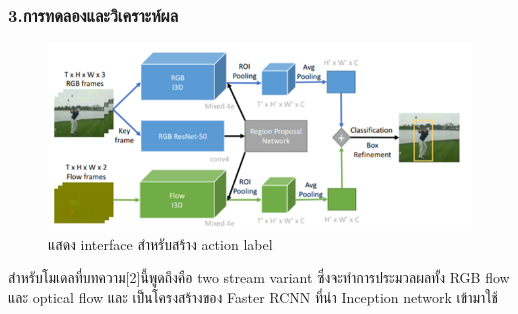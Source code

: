 \subsubsection*{3.การทดลองและวิเคราะห์ผล}	
\begin{figure}[!ht]
	\centering
	\includegraphics[width=1\textwidth]{chapter2/images/structure_ava.png}
		\caption{แสดง interface สำหรับสร้าง action label}
    	\label{fig:structure_ava}
\end{figure}
สำหรับโมเดลที่บทความ[2]นี้พูดถึงคือ two stream variant ซึ่งจะทำการประมวลผลทั้ง RGB flow และ optical flow และ เป็นโครงสร้างของ Faster RCNN ที่นำ Inception network เข้ามาใช้ 
